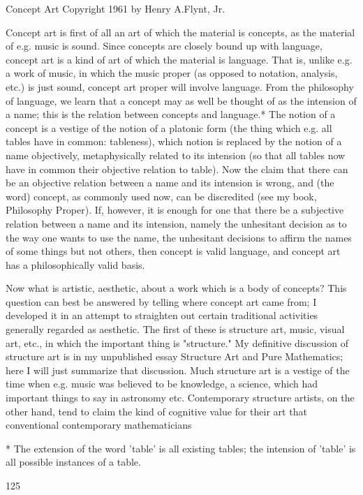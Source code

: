 \documentclass[10pt,twoside]{memoir}
\begin{document}
\begin{enumerate}
{{{{{{{{{{{{{{{{Concept Art 
Copyright 1961 by Henry A.Flynt, Jr. 


Concept art is first of all an art of which the material is concepts, as the 
material of e.g. music is sound. Since concepts are closely bound up with 
language, concept art is a kind of art of which the material is language. That 
is, unlike e.g. a work of music, in which the music proper (as opposed to 
notation, analysis, etc.) is just sound, concept art proper will involve 
language. From the philosophy of language, we learn that a concept may as 
well be thought of as the intension of a name; this is the relation between 
concepts and language.* The notion of a concept is a vestige of the notion of 
a platonic form (the thing which e.g. all tables have in common: tableness), 
which notion is replaced by the notion of a name objectively, metaphysically 
related to its intension (so that all tables now have in common their 
objective relation to table). Now the claim that there can be an objective 
relation between a name and its intension is wrong, and (the word) concept, 
as commonly used now, can be discredited (see my book, Philosophy 
Proper). If, however, it is enough for one that there be a subjective relation 
between a name and its intension, namely the unhesitant decision as to the 
way one wants to use the name, the unhesitant decisions to affirm the names 
of some things but not others, then concept is valid language, and concept 
art has a philosophically valid basis. 

Now what is artistic, aesthetic, about a work which is a body of 
concepts? This question can best be answered by telling where concept art 
came from; I developed it in an attempt to straighten out certain traditional 
activities generally regarded as aesthetic. The first of these is structure art, 
music, visual art, etc., in which the important thing is "structure." My 
definitive discussion of structure art is in my unpublished essay Structure 
Art and Pure Mathematics; here I will just summarize that discussion. Much 
structure art is a vestige of the time when e.g. music was believed to be 
knowledge, a science, which had important things to say in astronomy etc. 
Contemporary structure artists, on the other hand, tend to claim the kind of 
cognitive value for their art that conventional contemporary mathematicians 


* The extension of the word 'table' is all existing tables; the intension of 
'table' is all possible instances of a table. 


125 


}}}}}}}}}}}}}}}}
\end{enumerate}
\end{document}
